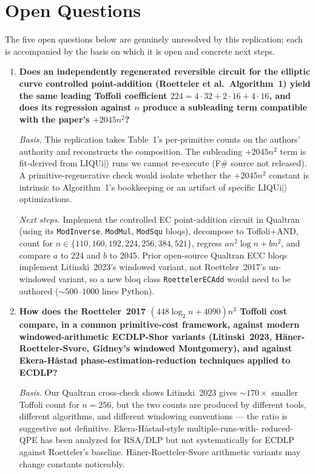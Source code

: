 \section{Open Questions}

The five open questions below are genuinely unresolved by this replication;
each is accompanied by the basis on which it is open and concrete next steps.

\begin{enumerate}

\item \textbf{Does an independently regenerated reversible circuit for the elliptic curve controlled point-addition (Roetteler et al.\ Algorithm~1) yield the same leading Toffoli coefficient $224 = 4\cdot 32 + 2\cdot 16 + 4\cdot 16$, and does its regression against $n$ produce a subleading term compatible with the paper's $+2045 n^2$?}

\emph{Basis.} This replication takes Table~1's per-primitive counts on the
authors' authority and reconstructs the composition. The subleading $+2045 n^2$
term is fit-derived from LIQUi$|\rangle$ runs we cannot re-execute (F\# source
not released). A primitive-regenerative check would isolate whether the
$+2045 n^2$ constant is intrinsic to Algorithm~1's bookkeeping or an artifact
of specific LIQUi$|\rangle$ optimizations.

\emph{Next steps.} Implement the controlled EC point-addition circuit in
Qualtran (using its \texttt{ModInverse}, \texttt{ModMul}, \texttt{ModSqu}
bloqs), decompose to Toffoli$+$AND, count for $n \in \{110, 160, 192, 224, 256,
384, 521\}$, regress $a n^2 \log n + b n^2$, and compare $a$ to 224 and $b$ to
2045. Prior open-source Qualtran ECC bloqs implement Litinski~2023's windowed
variant, not Roetteler~2017's un-windowed variant, so a new bloq class
\texttt{RoettelerECAdd} would need to be authored ($\sim 500$--$1000$ lines Python).

\item \textbf{How does the Roetteler~2017 $(448 \log_2 n + 4090) n^3$ Toffoli cost compare, in a common primitive-cost framework, against modern windowed-arithmetic ECDLP-Shor variants (Litinski~2023, H\"aner-Roetteler-Svore, Gidney's windowed Montgomery), and against Ekera-H\aa stad phase-estimation-reduction techniques applied to ECDLP?}

\emph{Basis.} Our Qualtran cross-check shows Litinski~2023 gives $\sim 170\times$
smaller Toffoli count for $n = 256$, but the two counts are produced by
different tools, different algorithms, and different windowing conventions ---
the ratio is suggestive not definitive. Ekera-H\aa stad-style multiple-runs-with-
reduced-QPE has been analyzed for RSA/DLP but not systematically for ECDLP
against Roetteler's baseline. H\"aner-Roetteler-Svore arithmetic variants may
change constants noticeably.


\end{enumerate}
